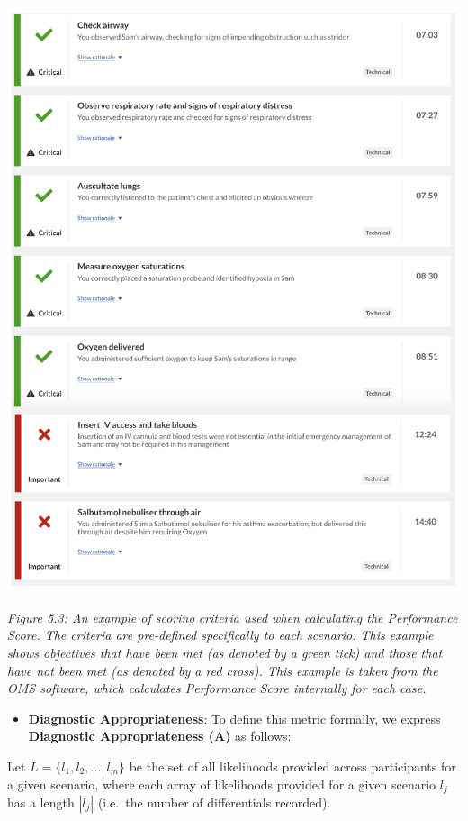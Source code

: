 \documentclass[a4paper, nobind]{templates/ociamthesis}
\providecommand{\tightlist}{%
  \setlength{\itemsep}{0pt}\setlength{\parskip}{0pt}}
\begin{document}
\newpage

\begin{center}\includegraphics[width=1\linewidth]{./assets/OMSScoreExample} \end{center}

\emph{Figure 5.3: An example of scoring criteria used when calculating the Performance Score. The criteria are pre-defined specifically to each scenario. This example shows objectives that have been met (as denoted by a green tick) and those that have not been met (as denoted by a red cross). This example is taken from the OMS software, which calculates Performance Score internally for each case.}

\begin{itemize}
\tightlist
\item
  \textbf{Diagnostic Appropriateness}: To define this metric formally, we express \textbf{Diagnostic Appropriateness (A)} as follows:
\end{itemize}

\hfill\break
Let \(L = \{ l_1, l_2, \ldots, l_m \}\) be the set of all likelihoods provided across participants for a given scenario, where each array of likelihoods provided for a given scenario \(l_j\) has a length \(|l_j|\) (i.e.~the number of differentials recorded).
\end{document}
